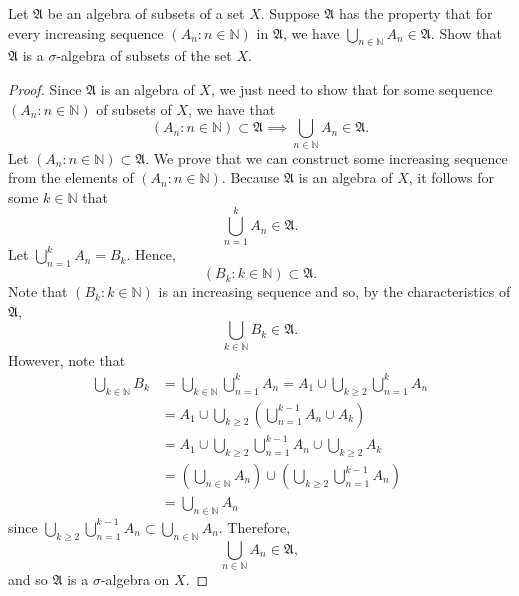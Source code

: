 \documentclass[12pt]{article}
\newcommand{\N}{\mathbb{N}}
\newenvironment{problem}[2][Problem]{\begin{trivlist}
		\item[\hskip \labelsep {\bfseries #1}\hskip \labelsep {\bfseries #2.}]}{\end{trivlist}}
\begin{document}
\begin{problem}{1.9}
	Let $\mathfrak{A}$ be an algebra of subsets of a set $X$. Suppose $\mathfrak{A}$ has the property that for every increasing sequence $\left(A_{n}:n\in \N\right)$ in $\mathfrak{A}$, we have $\bigcup_{n\in \N} A_{n} \in \mathfrak{A}$. Show that $\mathfrak{A}$ is a $\sigma$-algebra of subsets of the set $X$.
	\begin{proof}
		Since $\mathfrak{A}$ is an algebra of $X$, we just need to show that for some sequence $(A_{n}:n\in \N)$ of subsets of $X$, we have that
		\begin{equation*}
			(A_{n}:n\in \N) \subset \mathfrak{A} \implies \bigcup_{n\in \N} A_{n} \in \mathfrak{A}.
		\end{equation*}
	Let $(A_{n}:n\in \N) \subset \mathfrak{A}$. We prove that we can construct some increasing sequence from the elements of $(A_{n}:n\in \N)$. Because $\mathfrak{A}$ is an algebra of $X$, it follows for some $k\in \N$ that
	\begin{equation*}
		\bigcup_{n=1}^{k} A_{n} \in \mathfrak{A}.
	\end{equation*}
 Let $\bigcup_{n=1}^{k} A_{n} = B_{k}$. Hence, 
	\begin{equation*}
		\left(B_{k} : k\in \N\right) \subset \mathfrak{A}.
	\end{equation*}
Note that $\left(B_{k} : k\in \N\right)$ is an increasing sequence and so, by the characteristics of $\mathfrak{A}$,
\begin{equation*}
	\bigcup_{k\in \N} B_{k} \in \mathfrak{A}.
\end{equation*} 
However, note that 
\begin{align*}
	\bigcup_{k\in \N} B_{k} &= \bigcup_{k\in \N} \bigcup_{n=1}^{k} A_{n} = A_{1}\cup \bigcup_{k\geq 2} \bigcup_{n=1}^{k}A_{n}\\
	&= A_{1}\cup \bigcup_{k\geq 2} \left(\bigcup_{n=1}^{k-1}A_{n}\cup A_{k}\right)\\
	&= A_{1}\cup \bigcup_{k\geq 2} \bigcup_{n=1}^{k-1}A_{n} \cup \bigcup_{k\geq 2} A_{k}\\
	&= \left(\bigcup_{n\in \N} A_{n}\right) \cup \left(\bigcup_{k\geq 2} \bigcup_{n=1}^{k-1}A_{n}\right)\\
	&= \bigcup_{n\in \N} A_{n}
\end{align*}
since $\bigcup_{k\geq 2} \bigcup_{n=1}^{k-1}A_{n} \subset \bigcup_{n\in \N} A_{n}$. Therefore,
\begin{equation*}
	\bigcup_{n\in \N} A_{n} \in \mathfrak{A},
\end{equation*}
and so $\mathfrak{A}$ is a $\sigma$-algebra on $X$.
	\end{proof}
\end{problem}
\end{document}
